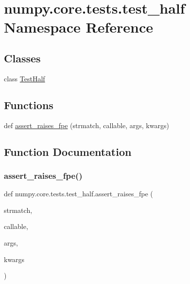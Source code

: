 \hypertarget{namespacenumpy_1_1core_1_1tests_1_1test__half}{}\section{numpy.\+core.\+tests.\+test\+\_\+half Namespace Reference}
\label{namespacenumpy_1_1core_1_1tests_1_1test__half}
\subsection*{Classes}
\begin{DoxyCompactItemize}
\item 
class \hyperlink{classnumpy_1_1core_1_1tests_1_1test__half_1_1TestHalf}{Test\+Half}
\end{DoxyCompactItemize}
\subsection*{Functions}
\begin{DoxyCompactItemize}
\item 
def \hyperlink{namespacenumpy_1_1core_1_1tests_1_1test__half_a56774fa262778b4eb6668248aaf48268}{assert\+\_\+raises\+\_\+fpe} (strmatch, callable, args, kwargs)
\end{DoxyCompactItemize}


\subsection{Function Documentation}
\mbox{\label{namespacenumpy_1_1core_1_1tests_1_1test__half_a56774fa262778b4eb6668248aaf48268}} 
\subsubsection{\texorpdfstring{assert\+\_\+raises\+\_\+fpe()}{assert\_raises\_fpe()}}
{\footnotesize\ttfamily def numpy.\+core.\+tests.\+test\+\_\+half.\+assert\+\_\+raises\+\_\+fpe (\begin{DoxyParamCaption}\item[{}]{strmatch,  }\item[{}]{callable,  }\item[{}]{args,  }\item[{}]{kwargs }\end{DoxyParamCaption})}

